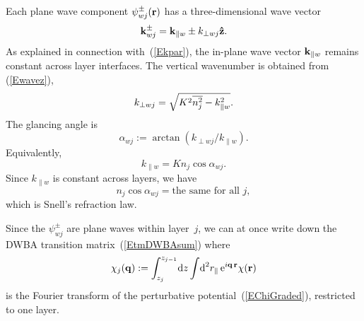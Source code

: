 Each plane wave component $\psi^\pm_{wj}(\mathbf{r})$ has
a three-dimensional wave vector
\begin{equation}
  \mathbf{k}^\pm_{wj}= \mathbf{k}_{\parallel w} \pm k_{\perp wj}\mathbf{\hat z}.
\end{equation}
%
%
As explained in connection with~(\ref{Ekpar}),
the in-plane wave vector $\mathbf{k}_{\parallel w}$ remains constant
across layer interfaces.
The vertical wavenumber is obtained from (\ref{Ewavez}),
\begin{equation}
  k_{\perp wj} = \sqrt{K^2 \overline{n_j^2} - k_{\parallel w}^2}.
\end{equation}
The glancing angle is
\begin{equation}\label{Edef_alpha}
  \alpha_{wj}:=\arctan(k_{\perp wj}/k_{\parallel w}).  
\end{equation}
Equivalently,
\begin{equation}
  k_{\parallel w}=K n_j \cos\alpha_{wj}. 
\end{equation}
Since $k_{\parallel w}$ is constant across layers,
we have
\begin{equation}\label{ESnell}
  n_j \cos\alpha_{wj} = \text{the same for all }j,
\end{equation}
which is Snell's refraction law.

Since the $\psi^\pm_{wj}$ are plane waves within layer~$j$,
we can at once write down the DWBA transition matrix~(\ref{EtmDWBAsum})
%
where
\begin{equation}\label{Echij}
  \chi_j(\mathbf{q})
  := \int_{z_j}^{z_{j-1}}\!\text{d} z \int\!\text{d}^2r_\parallel\, \text{e}^{i\mathbf{q}\,\mathbf{r}}\chi(\mathbf{r})
\end{equation}
%
is the Fourier transform
of the perturbative potential~(\ref{EChiGraded}),
restricted to one layer.

